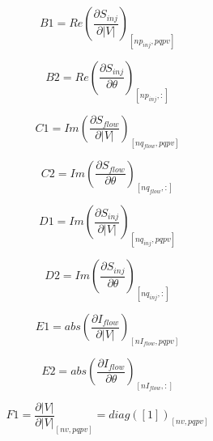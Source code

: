 \documentclass[nols,a4paper,twoside,notoc,fleqn]{tufte-book}
\begin{document}
\begin{equation}
B1 = Re\left(\frac{\partial S_{inj}}{\partial |V|}\right)_{[np_{inj}, pqpv]}
\end{equation}


\begin{equation}
B2 = Re\left(\frac{\partial S_{inj}}{\partial \theta}\right)_{[np_{inj}, :]}
\end{equation}


\begin{equation}
C1 = Im\left(\frac{\partial S_{flow}}{\partial |V|}\right)_{[nq_{flow}, pqpv]}
\end{equation}


\begin{equation}
C2 = Im\left(\frac{\partial S_{flow}}{\partial \theta}\right)_{[nq_{flow}, :]}
\end{equation}

\begin{equation}
D1 = Im\left(\frac{\partial S_{inj}}{\partial |V|}\right)_{[nq_{inj}, pqpv]}
\end{equation}


\begin{equation}
D2 = Im\left(\frac{\partial S_{inj}}{\partial \theta}\right)_{[nq_{inj}, :]}
\end{equation}


\begin{equation}
E1 = abs\left(\frac{\partial I_{flow}}{\partial |V|}\right)_{[nI_{flow}, pqpv]}
\end{equation}


\begin{equation}
E2 = abs\left(\frac{\partial I_{flow}}{\partial \theta}\right)_{[nI_{flow}, :]}
\end{equation}

\begin{equation}
F1 = \frac{\partial |V|}{\partial |V|}_{[nv, pqpv]} = diag([1])_{[nv, pqpv]}
\end{equation}
\end{document}
